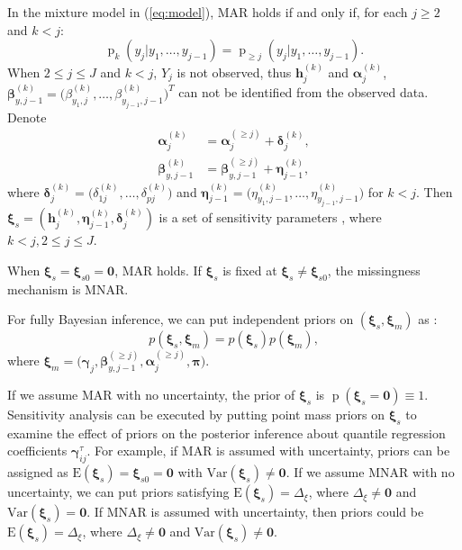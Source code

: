\documentclass[12pt]{article}
\DeclareMathOperator{\pr}{p}
\begin{document}
In the mixture model in (\ref{eq:model}), MAR holds \citep{molen1998,
  wang2011} if and only if, for each $j \geq 2$ and $k < j$:
\begin{equation}
  \label{eq:molen}
  \pr_k(y_j|y_1, \ldots, y_{j-1}) = \pr_{\geq j}(y_j|y_1, \ldots, y_{j-1}).
\end{equation}
When $2 \leq j \leq J$ and $k < j$, $Y_j$ is not observed, thus $\bm
h_j^{(k)}$ and $\bm \alpha_j^{(k)}$, $ \bm \beta_{y, j-1}^{(k)} =
\big(\beta_{y_1,j}^{(k)}, \ldots, \beta_{y_{j-1},j-1}^{(k)} \big)^T $
can not be identified from the observed data. Denote
\begin{align*}
  \bm \alpha_j^{(k)} &= \bm \alpha_j^{(\geq j)} + \bm \delta_{j}^{(k)}, \\
  \bm \beta_{y, j-1}^{(k)} &= \bm \beta_{y, j-1}^{(\geq j)} + \bm
  \eta_{j-1}^{(k)},
\end{align*}
where $\bm \delta_j^{(k)} = \big( \delta_{1j}^{(k)}, \ldots,
\delta_{pj}^{(k)} \big)$ and $\bm \eta_{j-1}^{(k)} = \big(
\eta_{y_1,j-1}^{(k)}, \ldots, \eta_{y_{j-1}, j-1}^{(k)} \big)$ for $k
< j$. Then $\bm \xi_s = ( \bm h_j^{(k)}, \bm \eta_{j-1}^{(k)}, \bm
\delta_j^{(k)})$ is a set of sensitivity parameters \citep{dh2008},
where $k < j, 2 \leq j \leq J $.

When $\bm \xi_s = \bm \xi_{s0} = \bm 0$, MAR holds. If $\bm \xi_s$ is
fixed at $\bm \xi_s \neq \bm \xi_{s0}$, the missingness mechanism is
MNAR.

For fully Bayesian inference, we can put independent priors on $(\bm
\xi_s, \bm \xi_m)$ as :
\begin{displaymath}
  p(\bm \xi_s, \bm \xi_m) = p(\bm \xi_s) p(\bm \xi_m),
\end{displaymath}
where $\bm \xi_m = \big(\bm \gamma_j, \bm \beta_{y, j-1}^{(\geq j)},
\bm \alpha_j^{(\geq j)}, \bm \pi \big)$.

If we assume MAR with no uncertainty, the prior of $\bm \xi_s$ is
$\pr(\bm \xi_s = \bm 0) \equiv 1$. Sensitivity analysis can be
executed by putting point mass priors on $\bm \xi_s$ to examine the
effect of priors on the posterior inference about quantile regression
coefficients $\bm \gamma_{ij}^{\tau}$. For example, if MAR is assumed
with uncertainty, priors can be assigned as $\textrm{E}(\bm \xi_s) =
\bm \xi_{s0} = \bm 0$ with $\textrm{Var}(\bm \xi_s) \neq \bm 0$. If we
assume MNAR with no uncertainty, we can put priors satisfying
$\textrm{E}(\bm \xi_s) = \Delta_{\xi}$, where $\Delta_{\xi} \neq \bm
0$ and $\textrm{Var}(\bm \xi_s) = \bm 0$. If MNAR is assumed with
uncertainty, then priors could be $\textrm{E}(\bm \xi_s) =
\Delta_{\xi}$, where $\Delta_{\xi} \neq \bm 0 $ and $\textrm{Var}(\bm
\xi_s) \neq \bm 0$.
\end{document}
